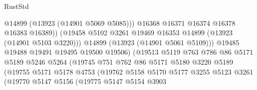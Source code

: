 \begin{lexlean}{RustStd}
\begin{coremodule}
                                          @14899
                                          (@13923 (@14901 @5069 @5085)))
                                        @16368
                                        @16371
                                        @16374
                                        @16378
                                        @16383
                                        @16389))
                                    (@19458
                                      @5102
                                      @3261
                                      @19469
                                      @16353
                                      @14899
                                      (@13923 (@14901 @5103 @3220)))
                                    @14899
                                    (@13923 (@14901 @5061 @5109)))
                                  @19485
                                  @19488
                                  @19491
                                  @19495
                                  @19500
                                  @19506)
                                (@19513
                                  @5119
                                  @763
                                  @786
                                  @86
                                  @5171
                                  @5189
                                  @5246
                                  @5264
                                  (@19745
                                    @751
                                    @762
                                    @86
                                    @5171
                                    @5180
                                    @3220
                                    @5189
                                    (@19755
                                      @5171
                                      @5178
                                      @4753
                                      (@19762
                                        @5158
                                        @5170
                                        @5177
                                        @3255
                                        @5123
                                        @3261
                                        (@19770
                                          @5147
                                          @5156
                                          (@19775
                                            @5147
                                            @5154
                                            @3903

\end{coremodule}
\end{lexlean}
